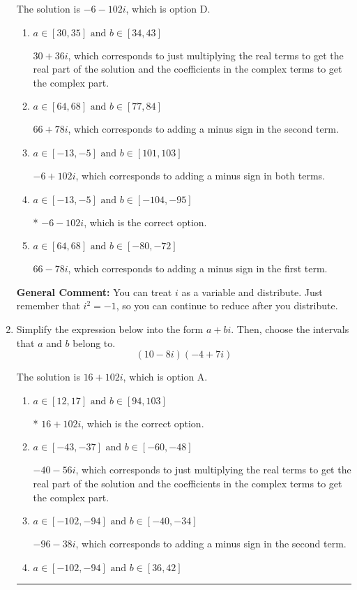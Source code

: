 \documentclass{extbook}[14pt]
\newcommand{\litem}[1]{\item #1

\rule{\textwidth}{0.4pt}}
\begin{document}
\begin{enumerate}
{The solution is \( -6 - 102 i \), which is option D.\begin{enumerate}[label=\Alph*.]
\item \( a \in [30, 35] \text{ and } b \in [34, 43] \)

 $30 + 36 i$, which corresponds to just multiplying the real terms to get the real part of the solution and the coefficients in the complex terms to get the complex part.
\item \( a \in [64, 68] \text{ and } b \in [77, 84] \)

 $66 + 78 i$, which corresponds to adding a minus sign in the second term.
\item \( a \in [-13, -5] \text{ and } b \in [101, 103] \)

 $-6 + 102 i$, which corresponds to adding a minus sign in both terms.
\item \( a \in [-13, -5] \text{ and } b \in [-104, -95] \)

* $-6 - 102 i$, which is the correct option.
\item \( a \in [64, 68] \text{ and } b \in [-80, -72] \)

 $66 - 78 i$, which corresponds to adding a minus sign in the first term.
\end{enumerate}

\textbf{General Comment:} You can treat $i$ as a variable and distribute. Just remember that $i^2=-1$, so you can continue to reduce after you distribute.
}
\litem{
Simplify the expression below into the form $a+bi$. Then, choose the intervals that $a$ and $b$ belong to.
\[ (10 - 8 i)(-4 + 7 i) \]

The solution is \( 16 + 102 i \), which is option A.\begin{enumerate}[label=\Alph*.]
\item \( a \in [12, 17] \text{ and } b \in [94, 103] \)

* $16 + 102 i$, which is the correct option.
\item \( a \in [-43, -37] \text{ and } b \in [-60, -48] \)

 $-40 - 56 i$, which corresponds to just multiplying the real terms to get the real part of the solution and the coefficients in the complex terms to get the complex part.
\item \( a \in [-102, -94] \text{ and } b \in [-40, -34] \)

 $-96 - 38 i$, which corresponds to adding a minus sign in the second term.
\item \( a \in [-102, -94] \text{ and } b \in [36, 42] \)


\end{enumerate}}
\end{enumerate}
\end{document}
